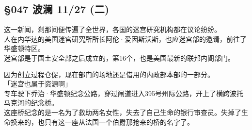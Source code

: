 \subsection{§047 波澜 11/27 (二)}

这一新闻，刹那间便传遍了全世界，各国的迷宫研究机构都在议论纷纷。\\

人在内华达的美国迷宫研究所所长阿伦·爱因斯沃斯，也应迷宫部的邀请，前往了华盛顿特区。\\

迷宫部是于国土安全部之后成立的，第16个，也是美国最新的联邦内阁部门。

因为创立过程仓促，现在部门的场地还是借用的内政部本部的一部分。\\

「迷宫也属于资源啊」\\

专车驶下乔治·华盛顿纪念公路，穿过闸道进入395号州际公路，开上了横跨波托马克河的纪念桥。\\

这座桥纪念的是一名为了救助两名女性，失去了自己生命的银行审查员。失掉了生命换来的，也只有这一座从法国一个伯爵那抢来的桥的名字了。\\

